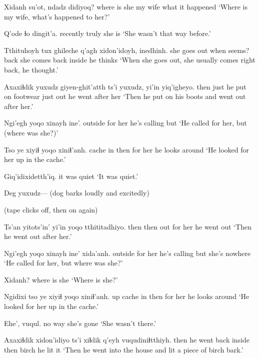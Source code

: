 \documentclass[12pt]{article}
\begin{document}
\gll Xidanh su'ot, ndadz didiyoq?
{where is she} {my wife} what {it happened}
\glt `Where is my wife, what's happened to her?'
\glend

\gll Q'ode ɬo dingit'a. 
recently  truly {she is} 
\glt `She wasn't that way before.'
\glend

\gll Tthituhoyh tux ghileche q'agh xidon'idoyh, inedhinh.
{she goes out} when seems? back {she comes back inside} {he thinks}
\glt `When she goes out, she usually comes right back, he thought.'
\glend

\gll Axaxiɬdik yuxudz giyen-ghit'atth ts'i yuxudz, yi'in yiq'igheyo.
then just {he put on footwear} {} just out {he went after her}
\glt `Then he put on his boots and went out after her.'
\glend


\gll Ngi'egh yoqo xinayh ine'. 
outside {for her} {he's calling} but 
\glt `He called for her, but (where was she?)'
\glend

\gll Tso ye xiyiɬ yoqo xiniɬ'anh.
cache in then {for her} {he looks around}
\glt `He looked for her up in the cache.'
\glend

\gll Giq'idixidetth'iq.
{{it was quiet}}
\glt `It was quiet.'
\glend

Deg yuxudz--- (dog barks loudly and excitedly)

(tape clicks off, then on again)

\gll Ts'an yitots'in' yi'in yoqo tthititadhiyo.
then then out {for her} {he went out}
\glt `Then he went out after her.'
\glend

\gll Ngi'egh yoqo xinayh ine' xida'anh.
outside {for her} {he's calling} but {she's nowhere}
\glt `He called for her, but where was she?'
\glend

\gll Xidanh?
{{where is she}}
\glt `Where is she?'
\glend

\gll Ngidixi tso ye xiyiɬ yoqo xiniɬ'anh.
up cache in then {for her} {he looks around}
\glt `He looked for her up in the cache.'
\glend

\gll Ehe', vuqul.
{no way} {she's gone}
\glt `She wasn't there.'
\glend

\gll Axaxiɬdik xidon'idiyo ts'i xiɬdik q'eyh vuqudiniɬtthiyh.
then {he went back inside} {} then {birch} {he lit it}
\glt `Then he went into the house and lit a piece of birch bark.'
\glend
\end{document}
